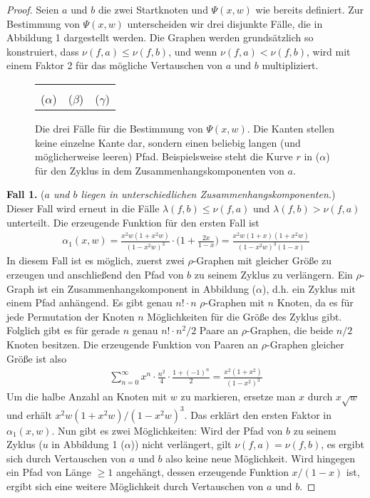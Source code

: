 \documentclass[a4paper, 10pt, ngerman]{article}
\begin{document}
\begin{proof}
    Seien $a$ und $b$ die zwei Startknoten und $\Psi(x, w)$ wie bereits definiert. Zur Bestimmung von $\Psi(x, w)$ unterscheiden wir drei disjunkte Fälle, die in Abbildung 1 dargestellt werden. Die Graphen werden grundsätzlich so konstruiert, dass $\nu(f, a) \le \nu(f, b)$, und wenn $\nu(f, a) < \nu(f, b)$, wird mit einem Faktor 2 für das mögliche Vertauschen von $a$ und $b$ multipliziert.

    \begin{figure}
        \begin{tabular}{ccc}
             &  &  \\
            ($\alpha$)                           & ($\beta$)                           & ($\gamma$)
        \end{tabular}
        \caption{Die drei Fälle für die Bestimmung von $\Psi(x, w)$. Die Kanten stellen keine einzelne Kante dar, sondern einen beliebig langen (und möglicherweise leeren) Pfad. Beispielsweise steht die Kurve $r$ in ($\alpha$) für den Zyklus in dem Zusammenhangskomponenten von $a$.}
    \end{figure}

    \textbf{Fall 1.} (\emph{$a$ und $b$ liegen in unterschiedlichen Zusammenhangskomponenten.}) Dieser Fall wird erneut in die Fälle $\lambda(f, b) \le \nu(f, a)$ und $\lambda(f, b) > \nu(f, a)$ unterteilt. Die erzeugende Funktion für den ersten Fall ist
    \begin{align*}
        \alpha_1(x, w) = \frac {x^2w(1 + x^2w)} {(1 - x^2w)^3} \cdot \Bigg (1 + \frac {2x} {1 - x} \Bigg ) = \frac {x^2w(1 + x)(1 + x^2w)} {(1 - x^2w)^3(1 - x)}
    \end{align*}
    In diesem Fall ist es möglich, zuerst zwei $\rho$-Graphen mit gleicher Größe zu erzeugen und anschließend den Pfad von $b$ zu seinem Zyklus zu verlängern. Ein $\rho$-Graph ist ein Zusammenhangskomponent in Abbildung ($\alpha$), d.h. ein Zyklus mit einem Pfad anhängend. Es gibt genau $n! \cdot n$ $\rho$-Graphen mit $n$ Knoten, da es für jede Permutation der Knoten $n$ Möglichkeiten für die Größe des Zyklus gibt. Folglich gibt es für gerade $n$ genau $n! \cdot n^2/2$ Paare an $\rho$-Graphen, die beide $n/2$ Knoten besitzen. Die erzeugende Funktion von Paaren an $\rho$-Graphen gleicher Größe ist also
    \begin{align*}
        \sum_{n = 0}^\infty x^n \cdot \frac {n^2} 4 \cdot \frac {1 + (-1)^n} 2 = \frac {x^2(1 + x^2)} {(1 - x^2)^3}
    \end{align*}
    Um die halbe Anzahl an Knoten mit $w$ zu markieren, ersetze man $x$ durch $x \sqrt w$ und erhält $x^2w(1 + x^2w) / (1 - x^2w)^3$. Das erklärt den ersten Faktor in $\alpha_1(x, w)$. Nun gibt es zwei Möglichkeiten: Wird der Pfad von $b$ zu seinem Zyklus ($u$ in Abbildung 1 ($\alpha$)) nicht verlängert, gilt $\nu(f, a) = \nu(f, b)$, es ergibt sich durch Vertauschen von $a$ und $b$ also keine neue Möglichkeit. Wird hingegen ein Pfad von Länge $\ge 1$ angehängt, dessen erzeugende Funktion $x/(1 - x)$ ist, ergibt sich eine weitere Möglichkeit durch Vertauschen von $a$ und $b$.


\end{proof}
\end{document}
